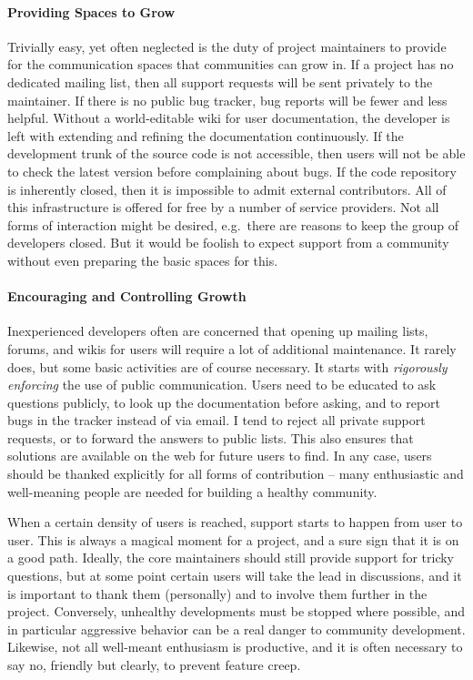 \paragraph*{Providing Spaces to Grow}
Trivially easy, yet often neglected is the duty of project maintainers to
provide for the communication spaces that communities can grow in. If a project
has no dedicated mailing list, then all support requests will be sent privately
to the maintainer. If there is no public bug tracker, bug reports will be fewer
and less helpful. Without a world-editable wiki for user documentation, the
developer is left with extending and refining the documentation continuously. If
the development trunk of the source code is not accessible, then users will not
be able to check the latest version before complaining about bugs. If the code
repository is inherently closed, then it is impossible to admit external
contributors. All of this infrastructure is offered for free by a number of
service providers. Not all forms of interaction might be desired, e.g.\ there
are reasons to keep the group of developers closed. But it would be foolish to
expect support from a community without even preparing the basic spaces for
this.

\paragraph*{Encouraging and Controlling Growth}
Inexperienced developers often are concerned that opening up mailing lists,
forums, and wikis for users will require a lot of additional maintenance. It
rarely does, but some basic activities are of course necessary. It starts with
\emph{rigorously enforcing} the use of public communication. Users need to be
educated to ask questions publicly, to look up the documentation before asking,
and to report bugs in the tracker instead of via email. I tend to reject all
private support requests, or to forward the answers to public lists. This also
ensures that solutions are available on the web for future users to find. In any
case, users should be thanked explicitly for all forms of contribution -- many
enthusiastic and well-meaning people are needed for building a healthy
community.

When a certain density of users is reached, support starts to happen from user
to user. This is always a magical moment for a project, and a sure sign that it
is on a good path. Ideally, the core maintainers should still provide support
for tricky questions, but at some point certain users will take the lead in
discussions, and it is important to thank them (personally) and to involve them
further in the project. Conversely, unhealthy developments must be stopped where
possible, and in particular aggressive behavior can be a real danger to
community development. Likewise, not all well-meant enthusiasm is productive,
and it is often necessary to say no, friendly but clearly, to prevent feature
creep.

